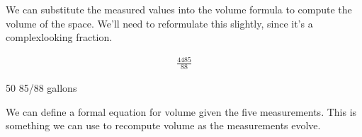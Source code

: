 \documentclass[letterpaper,10pt,english]{sphinxmanual}
\begin{document}
\sphinxAtStartPar
We can substitute the measured values into the volume formula to compute the volume of the space. We’ll need to reformulate this slightly, since it’s a complex\sphinxhyphen{}looking fraction.

\begin{sphinxVerbatim}[commandchars=\\\{\}]
\end{sphinxVerbatim}
\begin{equation*}
\begin{split}\displaystyle \frac{4485}{88}\end{split}
\end{equation*}
\begin{sphinxVerbatim}[commandchars=\\\{\}]
\end{sphinxVerbatim}

\begin{sphinxVerbatim}[commandchars=\\\{\}]
\PYGZsq{}50 85/88 gallons\PYGZsq{}
\end{sphinxVerbatim}

\sphinxAtStartPar
We can define a formal equation for volume given the five measurements. This is something we can use to recompute volume as the measurements evolve.
\end{document}

